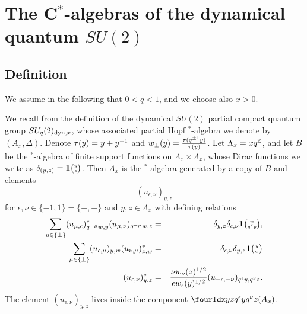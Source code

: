 


\section{The C$^*$-algebras of the dynamical quantum $SU(2)$}\label{SecUni}

\subsection{Definition}

We assume in the following that $0<q<1$, and we choose also $x>0$.

We recall from \cite{DCT1} the definition of the dynamical $SU(2)$ partial compact quantum group $SU_q(2)_{\operatorname{\mathrm{dyn}},x}$, whose associated partial Hopf $^*$-algebra we denote by $(A_x,\Delta)$. Denote $\operatorname{\tau}(y) = y+y^{-1}$ and $w_{\pm}(y) = \frac{\operatorname{\tau}(q^{\pm 1}y)}{\operatorname{\tau}(y)}$. Let $\Lambda_x = xq^{\mathbb{Z}}$, and let $B$ be the $^*$-algebra of finite support functions on $\Lambda_x\times \Lambda_x$, whose Dirac functions we write as $\delta_{(y,z)}=\mathbf{1}{\tiny {\begin{pmatrix} y\\z\end{pmatrix}}}$. Then $A_x$ is the $^*$-algebra generated by a copy of $B$ and elements \[(u_{\epsilon,\nu})_{y,z}\] for $\epsilon,\nu\in \{-1,1\}=\{-,+\}$ and $y,z\in \Lambda_x$ with defining relations \begin{eqnarray*} \sum_{\mu\in \{\pm\}} (u_{\mu,\epsilon})_{q^{-\mu}w,y}^* (u_{\mu,\nu})_{q^{-\mu}w,z}&=& \delta_{y,z} \delta_{\epsilon,\nu} \mathbf{1}{\tiny {\begin{pmatrix} w\\q^{\epsilon}y\end{pmatrix}}},\\ \sum_{\mu\in \{\pm\}} (u_{\epsilon,\mu})_{y,w} (u_{\nu,\mu})_{z,w}^* &=& \delta_{\epsilon,\nu}\delta_{y,z} \mathbf{1}{\tiny {\begin{pmatrix} y\\w\end{pmatrix}}} \\ (u_{\epsilon,\nu})_{y,z}^* &=& \frac{\nu w_{\nu}(z)^{1/2}}{\epsilon w_{\epsilon}(y)^{1/2}} (u_{-\epsilon,-\nu})_{q^{\epsilon}y,q^{\nu}z}.\end{eqnarray*} The element $(u_{\epsilon,\nu})_{y,z}$ lives inside the component $\Gr{(A_x)}{y}{q^{\epsilon}y}{z}{q^{\nu}z}$.

